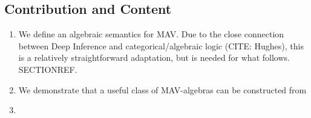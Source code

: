\subsection{Contribution and Content}\label{sec:contribution}


\begin{enumerate}
\item We define an algebraic semantics for MAV. Due to the close
  connection between Deep Inference and categorical/algebraic logic
  (CITE: Hughes), this is a relatively straightforward adaptation, but
  is needed for what follows. SECTIONREF.
\item We demonstrate that a useful class of MAV-algebras can be
  constructed from
\item
\end{enumerate}
